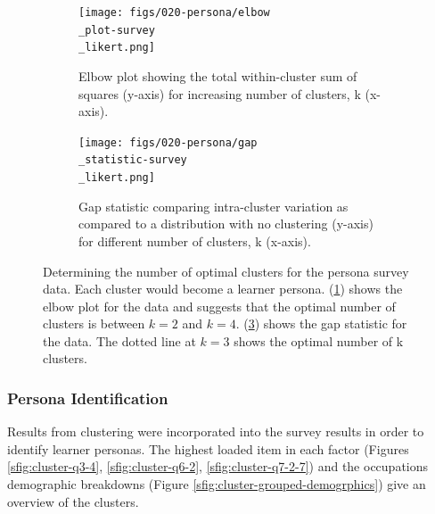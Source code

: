 \documentclass[020-persona\_validation.tex]{subfiles}
\begin{document}
        \begin{figure}[htb!]
            \centering
            \begin{subfigure}[h]{0.45\textwidth}
                \centering
                \texttt{[image: figs/020-persona/elbow\\\_plot-survey\\\_likert.png]}
                \caption[Elbow plot for determining optimal number of clusters.]
                {Elbow plot showing the total within-cluster sum of squares (y-axis) for increasing number of clusters, k (x-axis).
                }
                \label{sfig:cluster-elbow}
            \end{subfigure}
            \begin{subfigure}[h]{0.45\textwidth}
                \centering
                \texttt{[image: figs/020-persona/gap\\\_statistic-survey\\\_likert.png]}
                \caption[Gap statistic for determining optimal number of clusters.]
                {Gap statistic comparing
                    intra-cluster variation as compared to a distribution with no clustering (y-axis)
                    for different number of clusters, k (x-axis).
                }
                \label{sfig:cluster-gap}
            \end{subfigure}
            \caption[Elbow plot and Gap statistic for optimal number of clusters.]
            {Determining the number of optimal clusters for the persona survey data.
                Each cluster would become a learner persona.
                (\ref{sfig:cluster-elbow}) shows the elbow plot for the data and
                suggests that the optimal number of clusters is between $k=2$ and $k=4$.
                (\ref{sfig:cluster-gap}) shows the gap statistic for the data.
                The dotted line at $k=3$ shows the optimal number of k clusters.
            }
        \end{figure}

    \subsubsection{Persona Identification}

        Results from clustering were incorporated into the survey results in order to identify learner personas.
        The highest loaded item in each factor
        (Figures \ref{sfig:cluster-q3-4}, \ref{sfig:cluster-q6-2}, \ref{sfig:cluster-q7-2-7})
        and the occupations demographic breakdowns
        (Figure \ref{sfig:cluster-grouped-demogrphics})
        give an overview of the clusters.
\end{document}
